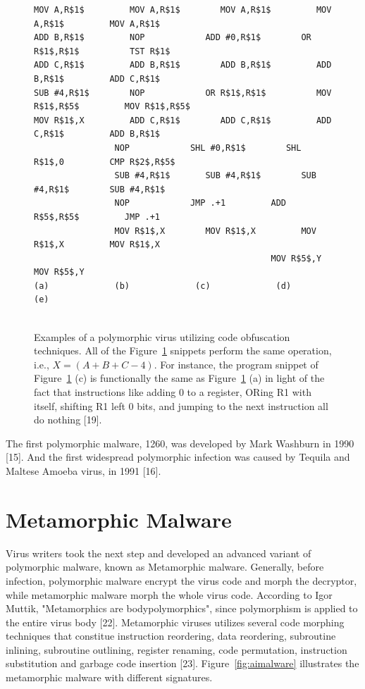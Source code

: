 \begin{figure}
  \centering
\begin{lstlisting}[language=myasm]
MOV A,R$1$         MOV A,R$1$        MOV A,R$1$         MOV A,R$1$         MOV A,R$1$
ADD B,R$1$         NOP            ADD #0,R$1$        OR R$1$,R$1$          TST R$1$
ADD C,R$1$         ADD B,R$1$        ADD B,R$1$         ADD B,R$1$         ADD C,R$1$
SUB #4,R$1$        NOP            OR R$1$,R$1$          MOV R$1$,R$5$         MOV R$1$,R$5$
MOV R$1$,X         ADD C,R$1$        ADD C,R$1$         ADD C,R$1$         ADD B,R$1$
                NOP            SHL #0,R$1$        SHL R$1$,0         CMP R$2$,R$5$
                SUB #4,R$1$       SUB #4,R$1$        SUB #4,R$1$        SUB #4,R$1$
                NOP            JMP .+1         ADD R$5$,R$5$         JMP .+1
                MOV R$1$,X        MOV R$1$,X         MOV R$1$,X         MOV R$1$,X
                                               MOV R$5$,Y         MOV R$5$,Y
(a)             (b)             (c)             (d)             (e)


\end{lstlisting}
    \caption[Examples of a polymorphic virus.]{Examples of a polymorphic virus utilizing code obfuscation techniques. All of the Figure~\ref{fig:polyvirus} snippets perform the same operation, i.e.,  $X = (A + B + C - 4)$. For instance, the program snippet of Figure~\ref{fig:polyvirus} (c) is functionally the same as Figure~\ref{fig:polyvirus} (a) in light of the fact that instructions like adding 0 to a register, ORing R1 with itself, shifting R1 left 0 bits, and jumping to the next instruction all do nothing [19].}
    \label{fig:polyvirus}
\end{figure}

    
The first polymorphic malware, 1260, was developed by Mark Washburn in 1990 [15]. And the first widespread polymorphic infection was caused by Tequila and Maltese Amoeba virus, in 1991 [16].

\section{Metamorphic Malware} 

Virus writers took the next step and developed an advanced variant of polymorphic malware, known as Metamorphic malware. Generally, before infection, polymorphic malware encrypt the virus code and morph the decryptor, while metamorphic malware morph the whole virus code. According to Igor Muttik, "Metamorphics are bodypolymorphics", since polymorphism is applied to the entire virus body [22]. Metamorphic viruses utilizes several code morphing techniques that constitue instruction reordering, data reordering, subroutine inlining, subroutine outlining, register renaming, code permutation, instruction substitution and garbage code insertion [23]. Figure~\ref{fig:aimalware} illustrates the metamorphic malware with different signatures.


